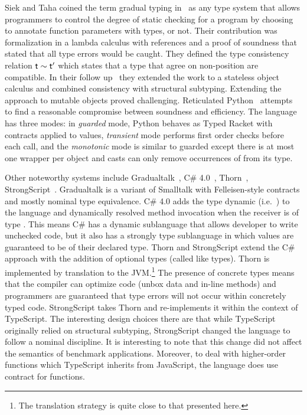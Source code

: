 \documentclass[a4paper,USenglish]{tex/lipics-v2016}
\begin{document}
Siek and Taha coined the term gradual typing in~\cite{SiekTaha06} as any
type system that allows programmers to control the degree of static checking
for a program by choosing to annotate function parameters with types, or
not. Their contribution was formalization in a lambda calculus with
references and a proof of soundness that stated that all type errors would
be caught. They defined the type consistency relation $\t \sim \tp$ which
states that a type that agree on non-\any position are compatible.  In their
follow up~\cite{SiekTaha07} they extended the work to a stateless object
calculus and combined consistency with structural subtyping. Extending the
approach to mutable objects proved challenging. Reticulated
Python~\cite{siek14} attempts to find a reasonable compromise between
soundness and efficiency.  The language has three modes: in \emph{guarded}
mode, Python behaves as Typed Racket with contracts applied to values,
\emph{transient} mode performs first order checks before each call, and the
\emph{monotonic} mode is similar to guarded except there is at most one
wrapper per object and casts can only remove occurrences of \any from its
type.

Other noteworthy systems include Gradualtalk~\cite{GS13}, C\#
4.0~\cite{Bierman10}, Thorn~\cite{oopsla09},
StrongScript~\cite{ecoop15}. Gradualtalk is a variant of Smalltalk with
Felleisen-style contracts and mostly nominal type equivalence. C\# 4.0 adds
the type {\sf dynamic} (i.e.~\any) to the language and dynamically resolved
method invocation when the receiver is of type \any.  This means C\# has a
dynamic sublanguage that allows developer to write unchecked code, but it
also has a strongly type sublanguage in which values are guaranteed to be of
their declared type.  Thorn and StrongScript extend the C\# approach with
the addition of optional types (called like types).  Thorn is
implemented by translation to the JVM.\footnote{The translation strategy is
  quite close to that presented here.} The presence of concrete types means
that the compiler can optimize code (unbox data and in-line methods) and
programmers are guaranteed that type errors will not occur within concretely
typed code.  StrongScript takes Thorn and re-implements it within the context
of TypeScript.  The interesting design choices there are that while
TypeScript originally relied on structural subtyping, StrongScript changed
the language to follow a nominal discipline. It is interesting to note that
this change did not affect the semantics of benchmark
applications. Moreover, to deal with higher-order functions which TypeScript
inherits from JavaScript, the language does use contract for functions.
\end{document}
